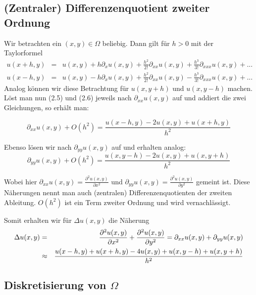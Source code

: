 \subsection{(Zentraler) Differenzenquotient zweiter Ordnung}\label{ss.Differenzenquotient zweiter Ordnung}

Wir betrachten ein $(x,y) \in \Omega$ beliebig. Dann gilt für $h > 0$ mit der Taylorformel
\begin{eqnarray}
u(x+h,y) &=& u(x,y) + h \partial_{x} u(x,y) + \frac {h^{2}} {2!} \partial_{xx} u(x,y) + \frac {h^{3}} {3!} \partial_{xxx} u(x,y) + ... \\
u(x-h,y) &=& u(x,y) - h \partial_{x} u(x,y) + \frac {h^{2}} {2!} \partial_{xx} u(x,y) - \frac {h^{3}} {3!} \partial_{xxx} u(x,y) + ...
\end{eqnarray}
Analog können wir diese Betrachtung für $u(x,y+h)$ und $u(x,y-h)$ machen. \\
Löst man nun (2.5) und (2.6) jeweils nach $\partial_{xx} u(x,y)$ auf und addiert die zwei Gleichungen, so erhält man:

\begin{equation}
\partial_{xx} u(x,y) + O(h^{2}) = \frac {u(x-h,y) - 2u(x,y) + u(x+h,y)} {h^{2}}
\end{equation}

Ebenso lösen wir nach $\partial_{yy} u(x,y)$ auf und erhalten analog:
\begin{equation}
\partial_{yy} u(x,y) + O(h^{2}) = \frac {u(x,y-h) - 2u(x,y) + u(x,y+h)} {h^{2}}
\end{equation}

Wobei hier $\partial_{xx} u(x,y) = \frac {\partial^{2} u(x,y)} {\partial x^{2}}$ und $\partial_{yy} u(x,y) = \frac {\partial^{2} u(x,y)} {\partial y^{2}}$ gemeint ist.
Diese Näherungen nennt man auch (zentralen) Differenzenquotienten der zweiten Ableitung. $O(h^{2})$ ist ein Term zweiter Ordnung und wird vernachlässigt.

Somit erhalten wir für $\Delta u(x,y)$ die Näherung
\begin{eqnarray}
\Delta u(x,y) &=& \frac {\partial^{2} u(x,y)} {\partial x^{2}} + \frac {\partial^{2} u(x,y)} {\partial y^{2}} = \partial_{xx} u(x,y) + \partial_{yy} u(x,y) \notag \\
&\approx& \frac {u(x-h,y) + u(x+h,y) - 4u(x,y) + u(x,y-h) + u(x,y+h)} {h^{2}}
\end{eqnarray}

\subsection{Diskretisierung von $\Omega$}\label{ss.Diskretisierung}

